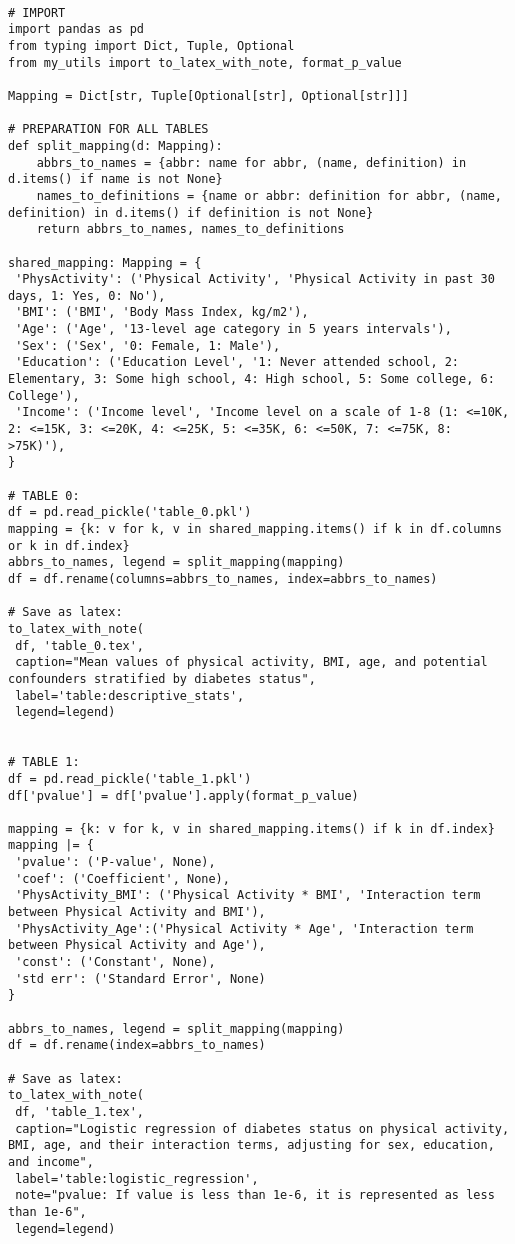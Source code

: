 \documentclass[11pt]{article}
\begin{document}
\begin{verbatim}

# IMPORT
import pandas as pd
from typing import Dict, Tuple, Optional
from my_utils import to_latex_with_note, format_p_value

Mapping = Dict[str, Tuple[Optional[str], Optional[str]]]

# PREPARATION FOR ALL TABLES
def split_mapping(d: Mapping):
    abbrs_to_names = {abbr: name for abbr, (name, definition) in d.items() if name is not None}
    names_to_definitions = {name or abbr: definition for abbr, (name, definition) in d.items() if definition is not None}
    return abbrs_to_names, names_to_definitions

shared_mapping: Mapping = {
 'PhysActivity': ('Physical Activity', 'Physical Activity in past 30 days, 1: Yes, 0: No'),
 'BMI': ('BMI', 'Body Mass Index, kg/m2'),
 'Age': ('Age', '13-level age category in 5 years intervals'),
 'Sex': ('Sex', '0: Female, 1: Male'),
 'Education': ('Education Level', '1: Never attended school, 2: Elementary, 3: Some high school, 4: High school, 5: Some college, 6: College'),
 'Income': ('Income level', 'Income level on a scale of 1-8 (1: <=10K, 2: <=15K, 3: <=20K, 4: <=25K, 5: <=35K, 6: <=50K, 7: <=75K, 8: >75K)'),
}

# TABLE 0:
df = pd.read_pickle('table_0.pkl')
mapping = {k: v for k, v in shared_mapping.items() if k in df.columns or k in df.index}
abbrs_to_names, legend = split_mapping(mapping)
df = df.rename(columns=abbrs_to_names, index=abbrs_to_names)

# Save as latex:
to_latex_with_note(
 df, 'table_0.tex',
 caption="Mean values of physical activity, BMI, age, and potential confounders stratified by diabetes status", 
 label='table:descriptive_stats',
 legend=legend)


# TABLE 1:
df = pd.read_pickle('table_1.pkl')
df['pvalue'] = df['pvalue'].apply(format_p_value)

mapping = {k: v for k, v in shared_mapping.items() if k in df.index}
mapping |= {
 'pvalue': ('P-value', None),
 'coef': ('Coefficient', None),
 'PhysActivity_BMI': ('Physical Activity * BMI', 'Interaction term between Physical Activity and BMI'),
 'PhysActivity_Age':('Physical Activity * Age', 'Interaction term between Physical Activity and Age'),
 'const': ('Constant', None),
 'std err': ('Standard Error', None)
}

abbrs_to_names, legend = split_mapping(mapping)
df = df.rename(index=abbrs_to_names)

# Save as latex:
to_latex_with_note(
 df, 'table_1.tex',
 caption="Logistic regression of diabetes status on physical activity, BMI, age, and their interaction terms, adjusting for sex, education, and income", 
 label='table:logistic_regression',
 note="pvalue: If value is less than 1e-6, it is represented as less than 1e-6",
 legend=legend)

\end{verbatim}
\end{document}
